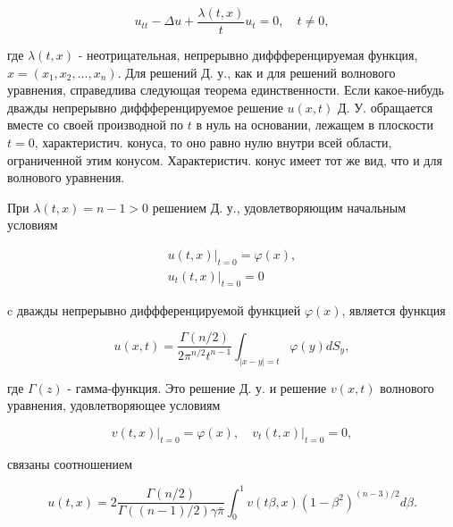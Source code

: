 \documentclass[10pt]{article}
\begin{document}
\[

u_{t t}-\Delta u+\frac{\lambda(t, x)}{t} u_{t}=0, \quad t \neq 0,

\]



где $\lambda(t, x)$ - неотрицательная, непрерывно диффференцируемая функция, $x=\left(x_{1}, x_{2}, \ldots, x_{n}\right)$. Для решений Д. у., как и для решений волнового уравнения, справедлива следующая теорема единственности. Если какое-нибудь дважды непрерывно диффференцируемое решение $u(x, t)$ Д. У. обращается вместе со своей производной по $t$ в нуль на основании, лежащем в плоскости $t=0$, характеристич. конуса, то оно равно нулю внутри всей области, ограниченной этим конусом. Характеристич. конус имеет тот же вид, что и для волнового уравнения.



При $\lambda(t, x)=n-1>0$ решением Д. у., удовлетворяющим начальным условиям



\[

\begin{gathered}

\left.u(t, x)\right|_{t=0}=\varphi(x), \\

\left.u_{t}(t, x)\right|_{t=0}=0

\end{gathered}

\]



c дважды непрерывно диффференцируемой функцией $\varphi(x)$, является функция



\[

u(x, t)=\frac{\Gamma(n / 2)}{2 \pi^{n / 2} t^{n-1}} \int_{|x-y|=t} \varphi(y) d S_{y},

\]



где $\Gamma(z)$ - гамма-функция. Это решение Д. у. и решение $v(x, t)$ волнового уравнения, удовлетворяющее условиям



\[

\left.v(t, x)\right|_{t=0}=\varphi(x),\left.\quad v_{t}(t, x)\right|_{t=0}=0,

\]



связаны соотношением



\[

u(t, x)=2 \frac{\Gamma(n / 2)}{\Gamma((n-1) / 2) \gamma \bar{\pi}} \int_{0}^{1} v(t \beta, x)\left(1-\beta^{2}\right)^{(n-3) / 2} d \beta .

\]
\end{document}
